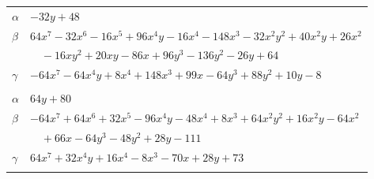 \documentclass[11pt]{article}
\begin{document}
\begin{longtable}{@{}ll@{}}
$\alpha$ & $-32y+48$\\
$\beta$ & $64x^{7}-32x^{6}-16x^{5}+96x^{4}y-16x^{4}-148x^{3}-32x^{2}y^{2}+40x^{2}y+26x^{2}$\\
 & $\quad -16xy^{2}+20xy-86x+96y^{3}-136y^{2}-26y+64$\\
$\gamma$ & $-64x^{7}-64x^{4}y+8x^{4}+148x^{3}+99x-64y^{3}+88y^{2}+10y-8$\\
\addlinespace[3pt]
\multicolumn{2}{@{}l}{$\{i,j\}=\{31,32\}$, $k_{ij}=7^{2}$}\\
$\alpha$ & $64y+80$\\
$\beta$ & $-64x^{7}+64x^{6}+32x^{5}-96x^{4}y-48x^{4}+8x^{3}+64x^{2}y^{2}+16x^{2}y-64x^{2}$\\
 & $\quad +66x-64y^{3}-48y^{2}+28y-111$\\
$\gamma$ & $64x^{7}+32x^{4}y+16x^{4}-8x^{3}-70x+28y+73$\\
\addlinespace[3pt]
\end{longtable}
\endgroup
\end{document}
